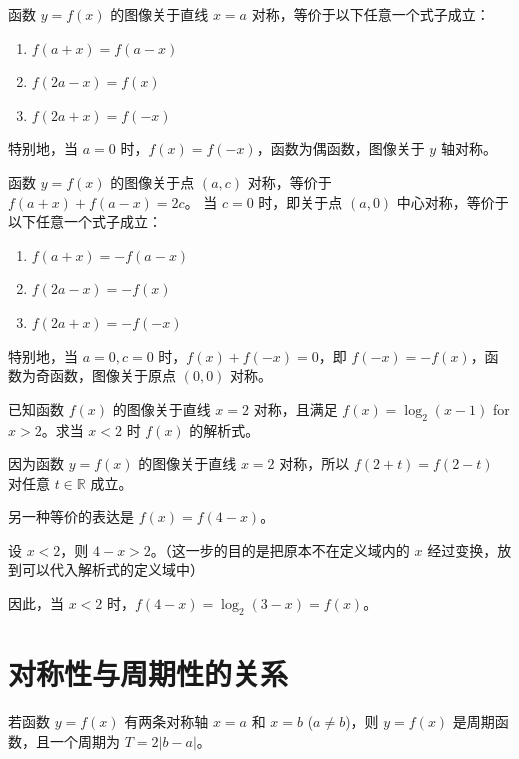 \begin{theorem}[轴对称的等价形式]
    函数 $y=f(x)$ 的图像关于直线 $x=a$ 对称，等价于以下任意一个式子成立：
    \begin{enumerate}
        \item $f(a+x) = f(a-x)$
        \item $f(2a-x) = f(x)$
        \item $f(2a+x) = f(-x)$
    \end{enumerate}
    特别地，当 $a=0$ 时，$f(x)=f(-x)$，函数为偶函数，图像关于 $y$ 轴对称。
\end{theorem}

\begin{theorem}[中心对称的等价形式]
    函数 $y=f(x)$ 的图像关于点 $(a, c)$ 对称，等价于 $f(a+x) + f(a-x) = 2c$。
    当 $c=0$ 时，即关于点 $(a,0)$ 中心对称，等价于以下任意一个式子成立：
    \begin{enumerate}
        \item $f(a+x) = -f(a-x)$
        \item $f(2a-x) = -f(x)$
        \item $f(2a+x) = -f(-x)$
    \end{enumerate}
    特别地，当 $a=0, c=0$ 时，$f(x)+f(-x)=0$，即 $f(-x)=-f(x)$，函数为奇函数，图像关于原点 $(0,0)$ 对称。
\end{theorem}

\begin{example}
    已知函数 $f(x)$ 的图像关于直线 $x=2$ 对称，且满足 $f(x) = \log_2(x-1)$ for $x > 2$。求当 $x<2$ 时 $f(x)$ 的解析式。
\end{example}

\begin{solution}
    因为函数 $y=f(x)$ 的图像关于直线 $x=2$ 对称，所以 $f(2+t) = f(2-t)$ 对任意 $t \in \mathbb{R}$ 成立。

    另一种等价的表达是 $f(x) = f(4-x)$。

    设 $x < 2$，则 $4-x > 2$。（这一步的目的是把原本不在定义域内的 $x$ 经过变换，放到可以代入解析式的定义域中）

    因此，当 $x<2$ 时，$f(4-x) = \log_2(3-x) = f(x)$。
\end{solution}

\section{对称性与周期性的关系}

\begin{theorem}[两条对称轴]
    若函数 $y=f(x)$ 有两条对称轴 $x=a$ 和 $x=b$ ($a \neq b$)，则 $y=f(x)$ 是周期函数，且一个周期为 $T=2|b-a|$。
\end{theorem}

